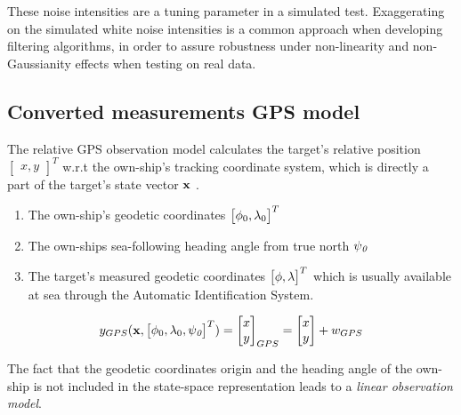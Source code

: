 These noise intensities are a tuning parameter in a simulated test. Exaggerating on the simulated white noise intensities is a common approach when developing filtering algorithms, in order to assure robustness under non-linearity and non-Gaussianity effects when testing on real data.

\subsection{Converted measurements GPS model}


The relative GPS observation model calculates the target's relative position $\begin{bmatrix}x, y\end{bmatrix}^{T} $ w.r.t the own-ship's tracking coordinate system, which is directly a part of the target's state vector $\mathbf{x}$
. 

\begin{enumerate}
\item The own-ship's geodetic coordinates $\begin{bmatrix}{\phi}_{0}, {\lambda}_{0} \end{bmatrix}^{T}$
\item The own-ships sea-following heading angle from true north ${\psi}_{\textit{0}}$
\item The target's measured geodetic coordinates $\begin{bmatrix}{\phi}, {\lambda}\end{bmatrix}^{T}$ which is usually available at sea through the Automatic Identification System.
\end{enumerate}




\begin{equation}
{{y}}_{GPS}(\mathbf{x},\begin{bmatrix}{\phi}_{0}, {\lambda}_{0}, {\psi}_{\textit{0}} \end{bmatrix}^{T}) = \begin{bmatrix}
x \\
y
\end{bmatrix}_{GPS} = \begin{bmatrix}
x \\
y
\end{bmatrix} + {w}_{GPS}
\end{equation}

The fact that the geodetic coordinates origin and the heading angle of the own-ship is not included in the state-space representation leads to a \emph{linear observation model}.

